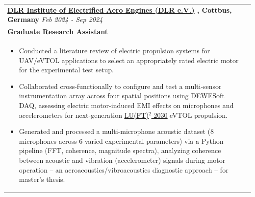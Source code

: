 \documentclass[a4paper,8pt]{article}
\newcommand{\ulhref}[2]{%
  {\hypersetup{urlcolor=.}\textcolor{.}{\href{#1}{\uline{#2}}}}%
}
\begin{document}
\begin{tabularx}{\linewidth}{ @{}l r@{} }
\textbf{{\ulhref{https://www.dlr.de/}{DLR Institute of Electrified Aero Engines (DLR e.V.)}}, Cottbus, Germany} \hfill \color[HTML]{371e77} \textit{Feb 2024 - Sep 2024} \\[1pt]
\color[HTML]{371e77}\textbf{Graduate Research Assistant}\ \hfill \color[HTML]{4B28A4} \\[1pt]
\begin{minipage}[t]{\linewidth}
    \begin{itemize}[nosep,after=\strut, leftmargin=*, itemsep=1pt]
        \item Conducted a literature review of electric propulsion systems for UAV/eVTOL applications to select an appropriately rated electric motor for the experimental test setup.
        \item Collaborated cross-functionally to configure and test a multi-sensor instrumentation array across four spatial positions using DEWESoft DAQ, assessing electric motor-induced EMI effects on microphones and accelerometers for next-generation \ulhref{https://www.dlr.de/en/as/research-and-transfer/projects/lu-ft-2-2030-effective-and-sustainable-noise-reduction-on-existing-aircraft}{LU(FT)\(^2\) 2030} eVTOL propulsion.
        \item Generated and processed a multi-microphone acoustic dataset (8 microphones across 6 varied experimental parameters) via a Python pipeline (FFT, coherence, magnitude spectra), analyzing coherence between acoustic and vibration (accelerometer) signals during motor operation -- an aeroacoustics/vibroacoustics diagnostic approach -- for master's thesis.
    \end{itemize}
\end{minipage}
\end{tabularx}
\end{document}
